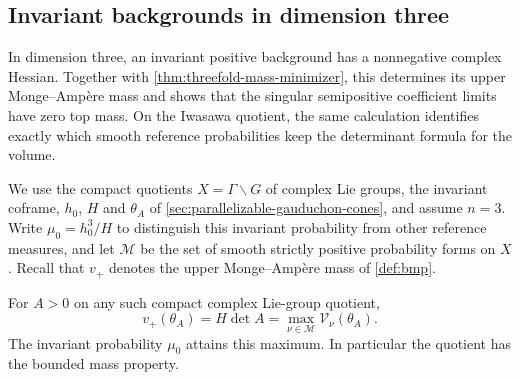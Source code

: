 \subsection{Invariant backgrounds in dimension three}
\label{sec:invariant-mass-reference-densities}

In dimension three, an invariant positive background has a nonnegative complex Hessian. Together with \cref{thm:threefold-mass-minimizer}, this determines its upper Monge--Amp\`ere mass and shows that the singular semipositive coefficient limits have zero top mass. On the Iwasawa quotient, the same calculation identifies exactly which smooth reference probabilities keep the determinant formula for the volume.

We use the compact quotients $X=\Gamma\backslash G$ of complex Lie groups, the invariant coframe, $h_0$, $H$ and $\theta_A$ of \cref{sec:parallelizable-gauduchon-cones}, and assume $n=3$. Write $\mu_0=h_0^3/H$ to distinguish this invariant probability from other reference measures, and let $\mathscr M$ be the set of smooth strictly positive probability forms on $X$. Recall that $v_+$ denotes the upper Monge--Amp\`ere mass of \cref{def:bmp}.

\begin{proposition}\label{prop:invariant-threefold-upper-mass}
For $A>0$ on any such compact complex Lie-group quotient,
\begin{equation}\label{eq:invariant-threefold-upper-mass}
 v_+(\theta_A)=H\det A
      =\max_{\nu\in\mathscr M}\mathcal V_\nu(\theta_A).
\end{equation}
The invariant probability $\mu_0$ attains this maximum. In particular the quotient has the bounded mass property.
\end{proposition}

